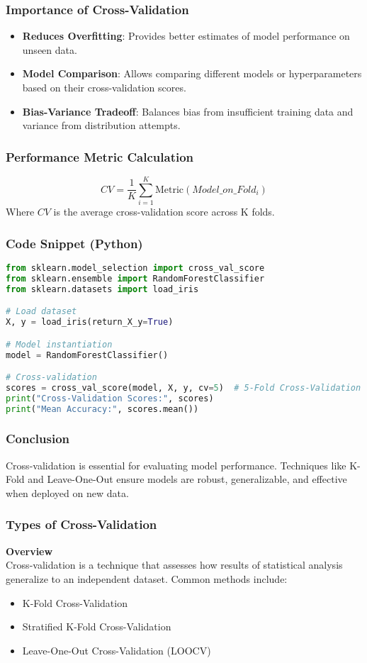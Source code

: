 \documentclass[aspectratio=169]{beamer}
\begin{document}
\begin{frame}[fragile]
    \frametitle{Importance of Cross-Validation}
    \begin{itemize}
        \item \textbf{Reduces Overfitting}: Provides better estimates of model performance on unseen data.
        \item \textbf{Model Comparison}: Allows comparing different models or hyperparameters based on their cross-validation scores.
        \item \textbf{Bias-Variance Tradeoff}: Balances bias from insufficient training data and variance from distribution attempts.
    \end{itemize}
\end{frame}

\begin{frame}[fragile]
    \frametitle{Performance Metric Calculation}
    \begin{equation}
        CV = \frac{1}{K} \sum_{i=1}^{K} \text{Metric}(Model\_on\_Fold_i)
    \end{equation}
    Where \( CV \) is the average cross-validation score across K folds.
\end{frame}

\begin{frame}[fragile]
    \frametitle{Code Snippet (Python)}
    \begin{lstlisting}[language=Python]
from sklearn.model_selection import cross_val_score
from sklearn.ensemble import RandomForestClassifier
from sklearn.datasets import load_iris

# Load dataset
X, y = load_iris(return_X_y=True)

# Model instantiation
model = RandomForestClassifier()

# Cross-validation
scores = cross_val_score(model, X, y, cv=5)  # 5-Fold Cross-Validation
print("Cross-Validation Scores:", scores)
print("Mean Accuracy:", scores.mean())
    \end{lstlisting}
\end{frame}

\begin{frame}[fragile]
    \frametitle{Conclusion}
    Cross-validation is essential for evaluating model performance. Techniques like K-Fold and Leave-One-Out ensure models are robust, generalizable, and effective when deployed on new data.
\end{frame}

\begin{frame}[fragile]
    \frametitle{Types of Cross-Validation}
    \textbf{Overview} \\
    Cross-validation is a technique that assesses how results of statistical analysis generalize to an independent dataset. Common methods include:
    \begin{itemize}
        \item K-Fold Cross-Validation
        \item Stratified K-Fold Cross-Validation
        \item Leave-One-Out Cross-Validation (LOOCV)
    \end{itemize}
\end{frame}
\end{document}
